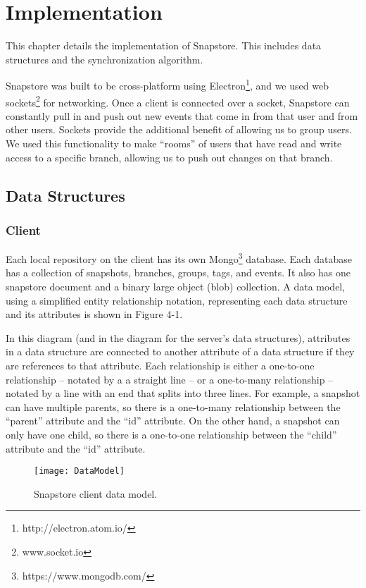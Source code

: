 \chapter{Implementation}

This chapter details the implementation of Snapstore. This includes data structures and the synchronization algorithm. 

Snapstore was built to be cross-platform using Electron\footnote{http://electron.atom.io/}, and we used web sockets\footnote{www.socket.io} for networking. Once a client is connected over a socket, Snapstore can constantly pull in and push out new events that come in from that user and from other users. Sockets provide the additional benefit of allowing us to group users. We used this functionality to make ``rooms'' of users that have read and write access to a specific branch, allowing us to push out changes on that branch.

\section{Data Structures}

\subsection{Client}

Each local repository on the client has its own Mongo\footnote{https://www.mongodb.com/} database. Each database has a collection of snapshots, branches, groups, tags, and events. It also has one snapstore document and a binary large object (blob) collection. A data model, using a simplified entity relationship notation, representing each data structure and its attributes is shown in Figure 4-1. 

In this diagram (and in the diagram for the server's data structures), attributes in a data structure are connected to another attribute of a data structure if they are references to that attribute. Each relationship is either a one-to-one relationship -- notated by a a straight line -- or a one-to-many relationship -- notated by a line with an end that splits into three lines. For example, a snapshot can have multiple parents, so there is a one-to-many relationship between the ``parent'' attribute and the ``id'' attribute. On the other hand, a snapshot can only have one child, so there is a one-to-one relationship between the ``child'' attribute and the ``id'' attribute.

\begin{figure}
\texttt{[image: DataModel]}
\caption{Snapstore client data model.}
\label{arm:fig1}
\end{figure}

